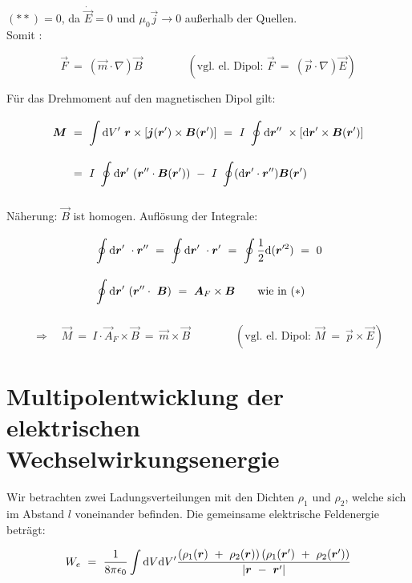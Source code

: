 $(**)=0$, da $\dot{\vec{E}}=0$ und $\mu_0\vec{j}\rightarrow 0$ außerhalb der Quellen.\\
Somit :

\begin{equation*}
\vec{F}  \ = \  (\vec{m}\cdot\nabla) \vec{B} \qquad\qquad (\text{vgl. el. Dipol: } \vec{F}  \ = \ (\vec{p}\cdot\nabla)\vec{E})
\end{equation*}

Für das Drehmoment auf den magnetischen Dipol gilt:

\begin{align*}
\vec{M}  \ &= \ \Int{}{}{V'} \vec{r}\times\left[\vec{j}(\vec{r}') \times \vec{B}(\vec{r}')\right] \ = \  I  \ \Oint{}{}{\vec{r}''} \times \left[\d\vec{r}' \times\vec{B}(\vec{r}')\right]\\
 &= \ I \ \Oint{}{}{\vec{r}'}(\vec{r}''\cdot\vec{B}(\vec{r}')) \ - \ I \ \oint(\d\vec{r}'\cdot\vec{r}'')\vec{B}(\vec{r}')
\end{align*}

Näherung: $\vec{B}$ ist homogen. Auflösung der Integrale:

\begin{align*}
&\Oint{}{}{\vec{r}'} \cdot \vec{r}'' \ = \ \Oint{}{}{\vec{r}'}\cdot\vec{r}'  \ = \ \oint\frac{1}{2}\d(\vec{r}'^2)  \ = \ 0\\
&\Oint{}{}{\vec{r}'} (\vec{r}''\cdot\ \vec{B})  \ = \ \vec{A}_F \times\vec{B} \qquad \text{wie in } (*)
\end{align*}

\begin{equation*}
\Rightarrow \quad \vec{M}  \ = \ I\cdot \vec{A}_F \times \vec{B} \ = \ \vec{m}\times\vec{B} \qquad\qquad (\text{vgl. el. Dipol: } \vec{M}  \ = \ \vec{p}\times\vec{E})
\end{equation*}

\section{Multipolentwicklung der elektrischen Wechselwirkungsenergie}

Wir betrachten zwei Ladungsverteilungen mit den Dichten $\rho_1$ und $\rho_2$, welche sich im Abstand $l$ voneinander befinden. Die gemeinsame elektrische Feldenergie beträgt:

\begin{equation*}
W_e \ = \ \frac{1}{8\pi\epsilon_0}\int\d V \d V' \frac{\left(\rho_1(\vec{r}) \ + \ \rho
_2(\vec{r})\right)\left(\rho_1 (\vec{r}') \ + \ \rho_2(\vec{r}')\right)}{|\vec{r} \ - \ \vec{r}'|}
\end{equation*}

